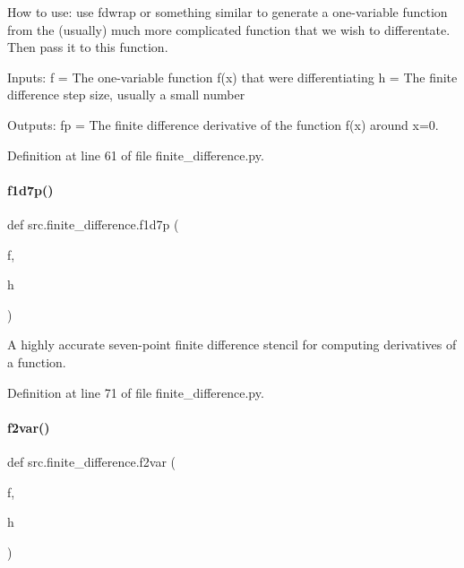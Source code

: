 How to use\+: use fdwrap or something similar to generate a one-\/variable function from the (usually) much more complicated function that we wish to differentate. Then pass it to this function.

Inputs\+: f = The one-\/variable function f(x) that we\textquotesingle{}re differentiating h = The finite difference step size, usually a small number

Outputs\+: fp = The finite difference derivative of the function f(x) around x=0. 

Definition at line 61 of file finite\+\_\+difference.\+py.

\mbox{\label{namespacesrc_1_1finite__difference_a49f3f0fa01ca9196dc99d73fd3dadf5a}} 
\paragraph{\texorpdfstring{f1d7p()}{f1d7p()}}
{\footnotesize\ttfamily def src.\+finite\+\_\+difference.\+f1d7p (\begin{DoxyParamCaption}\item[{}]{f,  }\item[{}]{h }\end{DoxyParamCaption})}



A highly accurate seven-\/point finite difference stencil for computing derivatives of a function. 



Definition at line 71 of file finite\+\_\+difference.\+py.

\mbox{\label{namespacesrc_1_1finite__difference_a524e09fa66783f7df59eaa707e28fd4c}} 
\paragraph{\texorpdfstring{f2var()}{f2var()}}
{\footnotesize\ttfamily def src.\+finite\+\_\+difference.\+f2var (\begin{DoxyParamCaption}\item[{}]{f,  }\item[{}]{h }\end{DoxyParamCaption})}



